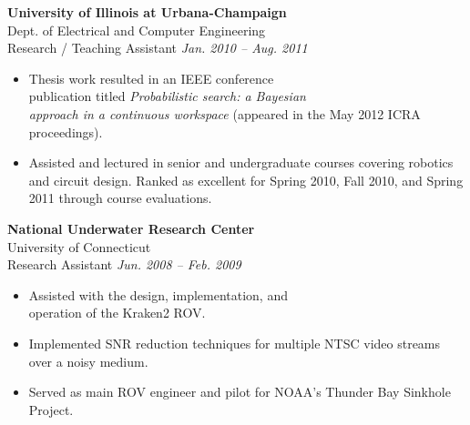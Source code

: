 \documentclass{article}
\begin{document}
{\begin{multicols}{2}
                \textbf{University of Illinois at Urbana-Champaign}\\ 
                Dept. of Electrical and Computer Engineering\\
                Research / Teaching Assistant \hfill \textsl{Jan. 2010 -- Aug. 2011} \\
                \vspace{ -10px}
                \begin{itemize}[noitemsep,nolistsep]
            	 \item Thesis work resulted in an IEEE conference \\publication titled \textsl{Probabilistic search: a Bayesian \\approach in a continuous workspace} (appeared in the May 2012 ICRA proceedings).  
                    \item Assisted and lectured in senior and undergraduate courses covering robotics and circuit design. Ranked as excellent for Spring 2010, Fall 2010, and Spring 2011 through course evaluations.
                \end{itemize}
                \vspace{10px}
                \vfill\null
                \columnbreak
                \textbf{National Underwater Research Center}\\ \hfill 
            	University of Connecticut\\ 
            	Research Assistant \hfill \textsl{Jun. 2008 -- Feb. 2009} \\
                \vspace{ -10px}
                \begin{itemize}[noitemsep,nolistsep]
                	\item Assisted with the design, implementation, and \\operation of the Kraken2 ROV.
                	\item Implemented SNR reduction techniques for multiple NTSC video streams over a noisy medium.
                	\item Served as main ROV engineer and pilot for NOAA's Thunder Bay Sinkhole Project. 
                \end{itemize}
                \vspace{5px}

\end{multicols}}
\end{document}
